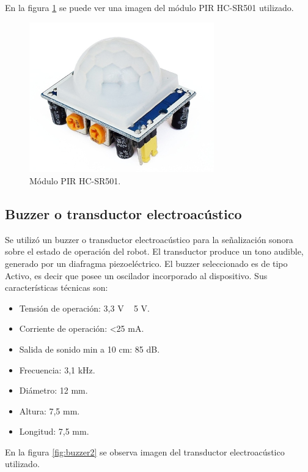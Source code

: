 En la figura \ref{fig:pir} se puede ver una imagen del módulo PIR HC-SR501 utilizado.

\begin{figure}[h]
	\centering
	\includegraphics[width=8cm]{./Figures/pir.PNG}
	\caption{Módulo PIR HC-SR501\protect\footnotemark.}
	\label{fig:pir}
\end{figure}


\subsection{Buzzer o transductor electroacústico}

Se utilizó un buzzer o transductor electroacústico para la señalización sonora sobre el estado de operación del robot. El transductor produce un tono audible, generado por un diafragma piezoeléctrico. 
El buzzer seleccionado es de tipo Activo, es decir que posee un oscilador incorporado al dispositivo. 
Sus características técnicas son:

\begin{itemize}
	\item Tensión de operación: 3,3 V ~ 5 V.
	\item Corriente de operación: <25 mA.
	\item Salida de sonido min a 10 cm: 85 dB.
	\item Frecuencia: 3,1 kHz. 	
	\item Diámetro: 12 mm.
	\item Altura: 7,5 mm.
	\item Longitud: 7,5 mm.	
\end{itemize}


En la figura \ref{fig:buzzer2} se observa imagen del transductor electroacústico utilizado.

